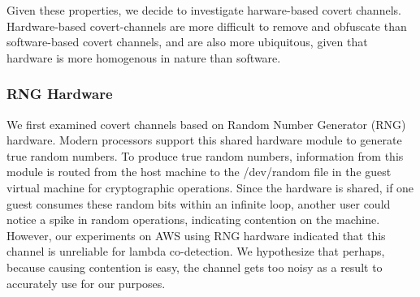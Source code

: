 Given these properties, we decide to investigate harware-based covert channels.
Hardware-based covert-channels are more difficult to remove and obfuscate than
software-based covert channels, and are also more ubiquitous, given that
hardware is more homogenous in nature than software. 

\subsubsection{RNG Hardware}
We first examined covert channels based on Random Number Generator (RNG)
hardware\cite{evtyushkinccs2016}.  Modern processors support this shared
hardware module to generate true random numbers. 
To produce true random numbers, information from this module is routed from the
host machine to the /dev/random file in the guest virtual machine for
cryptographic operations. Since the hardware is shared, if one guest consumes
these random bits within an infinite loop,
another user could notice a spike in random operations, indicating contention on
the machine.
However, our experiments on AWS using RNG hardware indicated that this channel
is unreliable for lambda co-detection. We hypothesize that perhaps, because
causing contention is easy, the channel gets too noisy as a result to accurately
use for our purposes.


